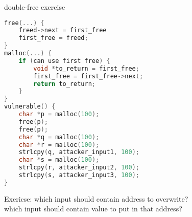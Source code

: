 \begin{frame}[fragile,label=doubleFreeExer]{double-free exercise}
\begin{lstlisting}[language=C++,style=script]
free(...) {
    freed->next = first_free
    first_free = freed;
}
malloc(...) {
    if (can use first free) {
        void *to_return = first_free;
        first_free = first_free->next;
        return to_return;
    }
}
vulnerable() {
    char *p = malloc(100);
    free(p);
    free(p);
    char *q = malloc(100);
    char *r = malloc(100);
    strlcpy(q, attacker_input1, 100);
    char *s = malloc(100);
    strlcpy(r, attacker_input2, 100);
    strlcpy(s, attacker_input3, 100);
}
\end{lstlisting}
Exericse: which input should contain address to overwrite? \\
which input should contain value to put in that address?
\end{frame}
